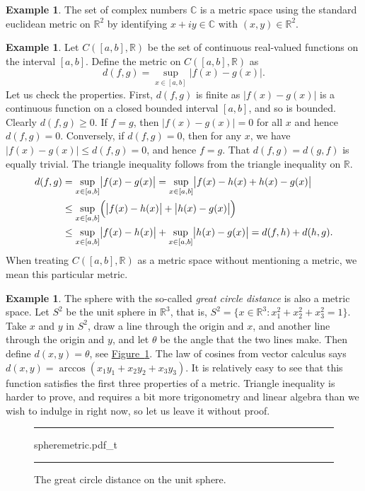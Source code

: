 \documentclass[12pt,openany]{book}
\newcommand{\babs}[1]{\bigl\lvert {#1} \bigr\rvert}
\newcommand{\abs}[1]{\left\lvert {#1} \right\rvert}
\newcommand{\C}{{\mathbb{C}}}
\newcommand{\R}{{\mathbb{R}}}
\newcommand{\myindex}[1]{#1\index{#1}}
\theoremstyle{plain}
\theoremstyle{remark}
\theoremstyle{definition}
\newenvironment{myfig}{%
\begin{figure}[h!t]
\noindent\rule{\textwidth}{0.5pt}\vspace{12pt}\par\centering}%
{\par\noindent\rule{\textwidth}{0.5pt}
\end{figure}}
\theoremstyle{exercise}
\theoremstyle{example}
\newtheorem{example}[thm]{Example}
\newcommand{\figureref}[1]{\hyperref[#1]{Figure~\ref*{#1}}}
\begin{document}
\begin{example} \label{example:mscomplex}
The set of complex numbers $\C$ is a metric space using the standard
euclidean metric on $\R^2$
by identifying $x+iy \in \C$ with $(x,y) \in \R^2$.
\end{example}

\begin{example} \label{example:msC01}
Let $C([a,b],\R)$ be the set of continuous real-valued functions on the
interval $[a,b]$.  Define the metric on $C([a,b],\R)$ as
\begin{equation*}
d(f,g) = \sup_{x \in [a,b]} \abs{f(x)-g(x)} .
\end{equation*}
Let us check the properties.  First, $d(f,g)$ is finite as
$\babs{f(x)-g(x)}$ is a continuous function on a closed bounded interval
$[a,b]$, and so is bounded.
Clearly $d(f,g) \geq 0$. 
If $f = g$,
then $\abs{f(x)-g(x)} = 0$ for all $x$ and hence $d(f,g) = 0$.  Conversely,
if $d(f,g) = 0$, then for any $x$, we have $\abs{f(x)-g(x)} \leq d(f,g) = 0$,
and hence $f=g$.  That $d(f,g) = d(g,f)$
is equally trivial.  The triangle inequality follows from the 
triangle inequality on $\R$.
\begin{equation*}
\begin{split}
d(f,g) & =
\sup_{x \in [a,b]} \babs{f(x)-g(x)} =
\sup_{x \in [a,b]} \babs{f(x)-h(x)+h(x)-g(x)}
\\
& \leq
\sup_{x \in [a,b]} \Bigl( \babs{f(x)-h(x)}+\babs{h(x)-g(x)} \Bigr)
\\
& \leq
\sup_{x \in [a,b]} \babs{f(x)-h(x)}+
\sup_{x \in [a,b]} \babs{h(x)-g(x)} = d(f,h) + d(h,g) .
\end{split}
\end{equation*}
When treating $C([a,b],\R)$ as a metric space without mentioning a metric, we mean this
particular metric.
\end{example}

\begin{example} \label{ms:greatcircle}
The sphere with the so-called
\emph{\myindex{great circle distance}} is also a metric space.
Let $S^2$ be the \myindex{unit sphere} in $\R^3$,
that is, $S^2 = \bigl\{ x \in \R^3 : x_1^2+x_2^2+x_3^2 = 1 \bigr\}$.
Take $x$ and $y$ in $S^2$, draw a line through the origin and $x$,
and another line through the origin and $y$,
and let $\theta$ be the angle that the two lines make.
Then define $d(x,y) = \theta$, see \figureref{fig:spheremetric}.
The law of cosines from vector calculus says
$d(x,y) = \arccos(x_1y_1+x_2y_2+x_3y_3)$.
It is relatively easy to see that this function satisfies the first three
properties of a metric.
Triangle inequality is harder to prove, and requires a bit more
trigonometry and linear algebra than we wish to indulge in right now, so let
us leave it without proof.
\begin{myfig}
{spheremetric.pdf_t}
\caption{The great circle distance on the unit sphere.\label{fig:spheremetric}}
\end{myfig}
\end{example}
\end{document}

